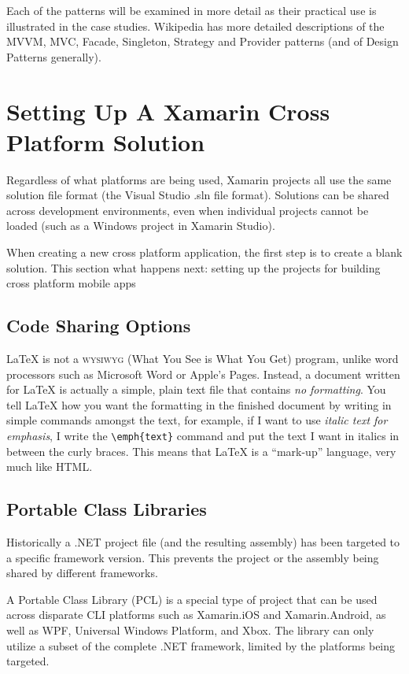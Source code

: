 Each of the patterns will be examined in more detail as their practical use is illustrated in the case studies. Wikipedia has more detailed descriptions of the MVVM, MVC, Facade, Singleton, Strategy and Provider patterns (and of Design Patterns generally).



\section{Setting Up A Xamarin Cross Platform Solution}

Regardless of what platforms are being used, Xamarin projects all use the same solution file format (the Visual Studio .sln file format).
Solutions can be shared across development environments, even when individual projects cannot be loaded (such as a Windows project in Xamarin Studio).

When creating a new cross platform application, the first step is to create a blank solution.
This section what happens next: setting up the projects for building cross platform mobile apps

\subsection{Code Sharing Options}
\LaTeX{} is not a \textsc{wysiwyg} (What You See is What You Get) program, unlike word processors such as Microsoft Word or Apple's Pages. Instead, a document written for \LaTeX{} is actually a simple, plain text file that contains \emph{no formatting}. You tell \LaTeX{} how you want the formatting in the finished document by writing in simple commands amongst the text, for example, if I want to use \emph{italic text for emphasis}, I write the \verb|\emph{text}| command and put the text I want in italics in between the curly braces. This means that \LaTeX{} is a \enquote{mark-up} language, very much like HTML.

\subsection{Portable Class Libraries}

Historically a .NET project file (and the resulting assembly) has been targeted to a specific framework version. This prevents the project or the assembly being shared by different frameworks.

A Portable Class Library (PCL) is a special type of project that can be used across disparate CLI platforms such as Xamarin.iOS and Xamarin.Android, as well as WPF, Universal Windows Platform, and Xbox. The library can only utilize a subset of the complete .NET framework, limited by the platforms being targeted.

